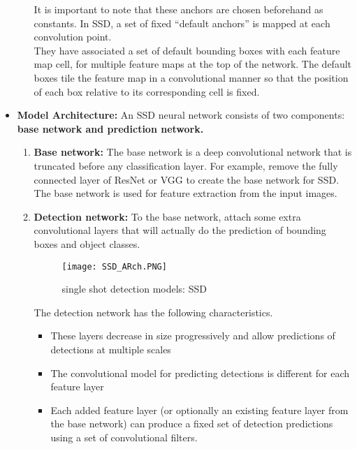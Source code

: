 \begin{itemize}
\begin{itemize}
        It is important to note that these anchors are chosen beforehand as constants. In SSD, a set of fixed “default anchors” is mapped at each convolution point.\\
        They have associated a set of default bounding boxes with each feature map cell, for multiple feature maps at the top of the network. The default boxes tile the feature map in a convolutional manner so that the position of each box relative to its corresponding cell is fixed.\\
            \end{itemize}
    \item \textbf{Model Architecture: } An SSD neural network consists of two components: \textbf{base network and prediction network.}
    \begin{enumerate}
        \item \textbf{Base network:} The base network is a deep convolutional network that is truncated before any classification layer. For example, remove the fully connected layer of ResNet or VGG to create the base network for SSD. The base network is used for feature extraction from the input images.
        \item \textbf{Detection network:} To the base network, attach some extra convolutional layers that will actually do the prediction of bounding boxes and object classes. 
        \begin{figure}[H]
        \centering
        \texttt{[image: SSD\_ARch.PNG]}
        \caption{single shot detection models: SSD \cite{liu2016ssd}}
        \label{fig: single shot detection models: SSD}
        \end{figure}
    The detection network has the following characteristics.
        \begin{itemize}
            \item These layers decrease in size progressively and allow
            predictions of detections at multiple scales
            \item  The convolutional model for predicting detections is different for each feature layer
            \item Each added feature layer (or optionally an existing
            feature layer from the base network) can produce a fixed set of detection predictions
            using a set of convolutional filters.
        \end{itemize}
    \end{enumerate}

\end{itemize}
